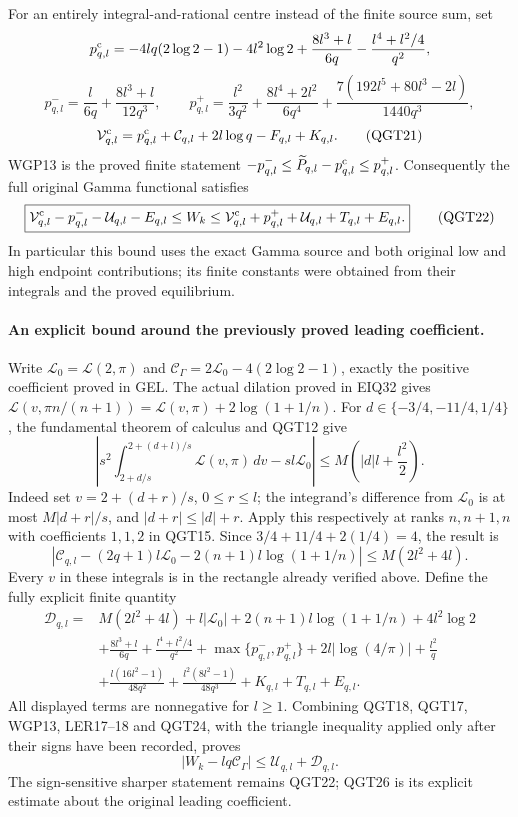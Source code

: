 \documentclass[11pt,a4paper]{article}
\begin{document}
For an entirely integral-and-rational centre instead of the finite
source sum, set
\[
 p^{\rm c}_{q,l}=-4lq(2\log2-1)-4l^2\log2
       +\frac{8l^3+l}{6q}-\frac{l^4+l^2/4}{q^2},
\]
\[
 p^-_{q,l}=\frac l{6q}+\frac{8l^3+l}{12q^3},\qquad
 p^+_{q,l}=\frac{l^2}{3q^2}
       +\frac{8l^4+2l^2}{6q^4}
       +\frac{7(192l^5+80l^3-2l)}{1440q^3},
\]
\[
 \mathcal V^{\rm c}_{q,l}
     =p^{\rm c}_{q,l}+\mathcal C_{q,l}
                        +2l\log q-F_{q,l}+K_{q,l}.
 \tag{QGT21}
\]
WGP13 is the proved finite statement
$-p^-_{q,l}\le\widetilde P_{q,l}-p^{\rm c}_{q,l}\le p^+_{q,l}$.
Consequently the full original Gamma functional satisfies
\[
 \boxed{\mathcal V^{\rm c}_{q,l}-p^-_{q,l}-\mathcal U_{q,l}-E_{q,l}
       \le W_k\le
       \mathcal V^{\rm c}_{q,l}+p^+_{q,l}
                         +\mathcal U_{q,l}+T_{q,l}+E_{q,l}.}
 \tag{QGT22}
\]
In particular this bound uses the exact Gamma source and both original
low and high endpoint contributions; its finite constants were
obtained from their integrals and the proved equilibrium.

\paragraph{An explicit bound around the previously proved leading coefficient.}
Write $\mathcal L_0=\mathcal L(2,\pi)$ and
$\mathcal C_\Gamma=2\mathcal L_0-4(2\log2-1)$, exactly the positive
coefficient proved in GEL. The actual dilation proved in EIQ32 gives
$\mathcal L(v,\pi n/(n+1))=
\mathcal L(v,\pi)+2\log(1+1/n)$.
For $d\in\{-3/4,-11/4,1/4\}$, the fundamental theorem of calculus
and QGT12 give
\[
 \left|s^2\int_{2+d/s}^{2+(d+l)/s}
           \mathcal L(v,\pi)\,dv-sl\mathcal L_0\right|
 \le M\left(|d|l+\frac{l^2}{2}\right).
 \tag{QGT23}
\]
Indeed set $v=2+(d+r)/s$, $0\le r\le l$; the integrand's
difference from $\mathcal L_0$ is at most $M|d+r|/s$,
and $|d+r|\le |d|+r$. Apply this respectively at ranks $n,n+1,n$
with coefficients $1,1,2$ in QGT15. Since
$3/4+11/4+2(1/4)=4$, the result is
\[
 \left|\mathcal C_{q,l}-(2q+1)l\mathcal L_0
                      -2(n+1)l\log(1+1/n)\right|
                    \le M(2l^2+4l).
 \tag{QGT24}
\]
Every $v$ in these integrals is in the rectangle already verified above.
Define the fully explicit finite quantity
\[
\begin{split}
 \mathcal D_{q,l}={}&M(2l^2+4l)+l|\mathcal L_0|
        +2(n+1)l\log(1+1/n)+4l^2\log2\\
 &+\frac{8l^3+l}{6q}+\frac{l^4+l^2/4}{q^2}
        +\max\{p^-_{q,l},p^+_{q,l}\}
        +2l|\log(4/\pi)|+\frac{l^2}{q}\\
 &+\frac{l(16l^2-1)}{48q^2}
        +\frac{l^2(8l^2-1)}{48q^3}
        +K_{q,l}+T_{q,l}+E_{q,l}.
\end{split}
 \tag{QGT25}
\]
All displayed terms are nonnegative for $l\ge1$. Combining
QGT18, QGT17, WGP13, LER17--18 and QGT24, with the triangle inequality
applied only after their signs have been recorded, proves
\[
 \boxed{|W_k-lq\mathcal C_\Gamma|
                     \le\mathcal U_{q,l}+\mathcal D_{q,l}.}
 \tag{QGT26}
\]
The sign-sensitive sharper statement remains QGT22; QGT26 is its
explicit estimate about the original leading coefficient.
\end{document}
